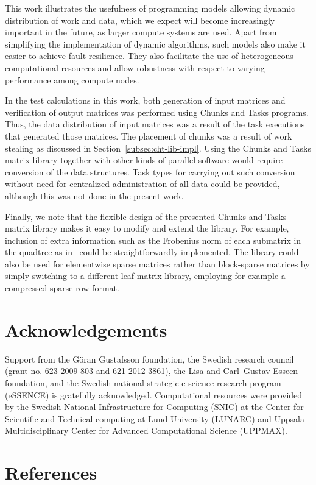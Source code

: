 \documentclass{elsarticle}
\begin{document}
This work illustrates the usefulness of programming models allowing dynamic distribution of
work and data, which we expect will become increasingly important in the future, as
larger compute systems are used.
Apart from simplifying the implementation of dynamic algorithms, 
such models also make it easier to achieve
fault resilience. They also facilitate the use of heterogeneous
computational resources and allow robustness with respect to varying
performance among compute nodes.

In the test calculations in this work, both generation of input
matrices and verification of output matrices was performed using
Chunks and Tasks programs. Thus, the data distribution of input
matrices was a result of the task executions that generated those
matrices. The placement of chunks was a result of work stealing as
discussed in Section~\ref{subsec:cht-lib-impl}. Using the Chunks and
Tasks matrix library together with other kinds of parallel software
would require conversion of the data structures. Task types for
carrying out such conversion without need for centralized administration
of all data could be provided, although this was not done in the
present work.

 

Finally, we note that the flexible design of the presented Chunks and
Tasks matrix library makes it easy to modify and extend the
library. For example, inclusion of extra information such as the
Frobenius norm of each submatrix in the quadtree as
in~\cite{BockChallacombeSISC2013} could be straightforwardly
implemented. The library could also be used for elementwise sparse
matrices rather than block-sparse matrices by simply switching to a
different leaf matrix library, employing for example a compressed
sparse row format.








\section*{Acknowledgements}

Support from the G{\"o}ran Gustafsson foundation, the Swedish research
council (grant no. 623-2009-803 and 621-2012-3861), the Lisa and
Carl--Gustav Esseen foundation, and the Swedish national strategic
e-science research program (eSSENCE) is gratefully acknowledged.
Computational resources were provided by the Swedish National
Infrastructure for Computing (SNIC) at the Center for Scientific and
Technical computing at Lund University (LUNARC) and Uppsala
Multidisciplinary Center for Advanced Computational Science (UPPMAX).


\section*{References}


\end{document}
